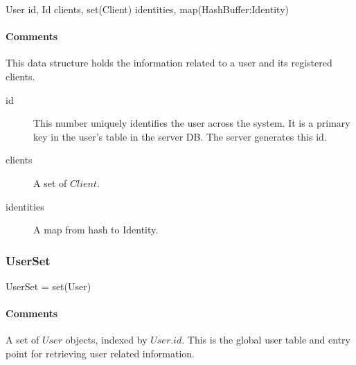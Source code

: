 \documentclass[a4paper,10pt]{article}
\begin{document}
\begin{verbbox}
User
{
  id, Id
  clients, set(Client)
  identities, map(HashBuffer:Identity)
}
\end{verbbox}
\begin{center}
\theverbbox
\end{center}

\begin{inparaitem}[ ]
 \item \infrastructure
\end{inparaitem}

\paragraph*{Comments}
This data structure holds the information related to a user and its registered clients.

\SpecialItem
\begin{description}
 \item[id] This number uniquely identifies the user across the system. It is a primary key in the user's table in the server DB. The server generates this id.
 \item[clients] A set of $Client$.
 \item[identities] A map from hash to Identity.
\end{description}

\subsubsection{UserSet}

\begin{verbbox}
UserSet = set(User)
\end{verbbox}
\begin{center}
\theverbbox
\end{center}

\begin{inparaitem}[ ]
 \item \secure
 \item \persistent
 \item \unique
\end{inparaitem}

\paragraph*{Comments}
A set of $User$ objects, indexed by $User.id$. This is the global user table and entry point for retrieving user related information.



\end{document}
